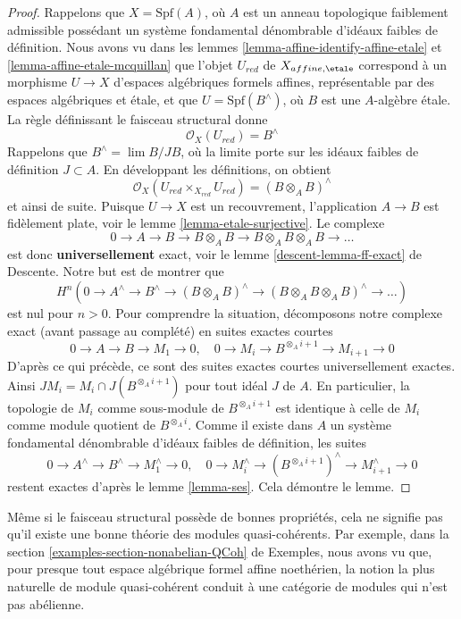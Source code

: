 \begin{proof}
\medskip\noindent
Rappelons que $X = \text{Spf}(A)$, où $A$ est un
anneau topologique faiblement admissible possédant un système
fondamental dénombrable d'idéaux faibles de définition.
Nous avons vu dans les lemmes
\ref{lemma-affine-identify-affine-etale} et
\ref{lemma-affine-etale-mcquillan}
que l'objet $U_{red}$ de $X_{affine, \etale}$
correspond à un morphisme $U \to X$ d'espaces algébriques formels
affines, représentable par des espaces algébriques et \'etale,
et que $U = \text{Spf}(B^\wedge)$, où $B$ est une $A$-algèbre \'etale.
La règle définissant le faisceau structural donne
$$
\mathcal{O}_X(U_{red}) = B^\wedge
$$
Rappelons que $B^\wedge = \lim B/JB$, où la limite porte sur les
idéaux faibles de définition $J \subset A$.
En développant les définitions, on obtient
$$
\mathcal{O}_X(U_{red} \times_{X_{red}} U_{red}) = (B \otimes_A B)^\wedge
$$
et ainsi de suite. Puisque $U \to X$ est un recouvrement, l'application $A \to B$
est fidèlement plate, voir le lemme \ref{lemma-etale-surjective}.
Le complexe
$$
0 \to A \to B \to B \otimes_A B \to B \otimes_A B \otimes_A B \to \ldots
$$
est donc {\bf universellement} exact, voir le lemme \ref{descent-lemma-ff-exact} de Descente.
Notre but est de montrer que
$$
H^n(0 \to A^\wedge \to B^\wedge \to (B \otimes_A B)^\wedge
\to (B \otimes_A B \otimes_A B)^\wedge \to \ldots)
$$
est nul pour $n > 0$. Pour comprendre la situation, décomposons notre
complexe exact (avant passage au complété) en suites exactes courtes
$$
0 \to A \to B \to M_1 \to 0,\quad
0 \to M_i \to B^{\otimes_A i + 1} \to M_{i + 1} \to 0
$$
D'après ce qui précède, ce sont des suites exactes courtes universellement
exactes. Ainsi $JM_i = M_i \cap J(B^{\otimes_A i + 1})$ pour
tout idéal $J$ de $A$. En particulier, la
topologie de $M_i$ comme sous-module de $B^{\otimes_A i + 1}$
est identique à celle de $M_i$ comme module quotient de
$B^{\otimes_A i}$. Comme il existe dans $A$ un système fondamental dénombrable
d'idéaux faibles de définition, les suites
$$
0 \to A^\wedge \to B^\wedge \to M_1^\wedge \to 0,\quad
0 \to M_i^\wedge \to (B^{\otimes_A i + 1})^\wedge \to M_{i + 1}^\wedge \to 0
$$
restent exactes d'après le lemme \ref{lemma-ses}. Cela démontre le lemme.
\end{proof}

\begin{remark}
\label{remark-bad-quasi-coherent}
Même si le faisceau structural possède de bonnes propriétés, cela ne
signifie pas qu'il existe une bonne théorie des modules quasi-cohérents. Par exemple,
dans la section \ref{examples-section-nonabelian-QCoh} de Exemples,
nous avons vu que, pour presque tout espace algébrique formel affine noethérien,
la notion la plus naturelle de module quasi-cohérent conduit à une
catégorie de modules qui n'est pas abélienne.
\end{remark}





